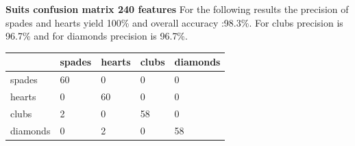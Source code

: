 \documentclass[11pt]{article}
\theoremstyle{plain}
\theoremstyle{definition}
\begin{document}
 \newpage
{\bf Suits confusion matrix 240 features}
\newline
\newline
For the following results the precision of spades and hearts yield 100\% and overall accuracy :98.3\%. For clubs precision is 96.7\% and for diamonds precision is 96.7\%.
 \begin{center}
    \begin{tabular}{| l | l |  l | l | p{2cm} |}
    \hline
      & spades & hearts & clubs &diamonds \\ \hline
 	   spades & 60 & 0 & 0 &0\\ \hline
 	   hearts & 0 & 60 & 0 &0\\ \hline
 	   clubs & 2 & 0 & 58 &0\\ \hline
 	   diamonds & 0 & 2 & 0&58\\ \hline
    \end{tabular}
 \end{center}
\end{document}

